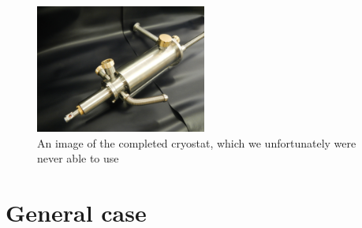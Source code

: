 \documentclass[journal,a4paper]{IEEEtran}
\begin{document}
\begin{figure}[h]
\includegraphics[width=0.5\textwidth]{cryostat1}
\caption{An image of the completed cryostat, which we unfortunately were never able to use}
\label{fig:cryostat1}
\end{figure}



%



\label{sec:app}

\section*{General case}
\end{document}
